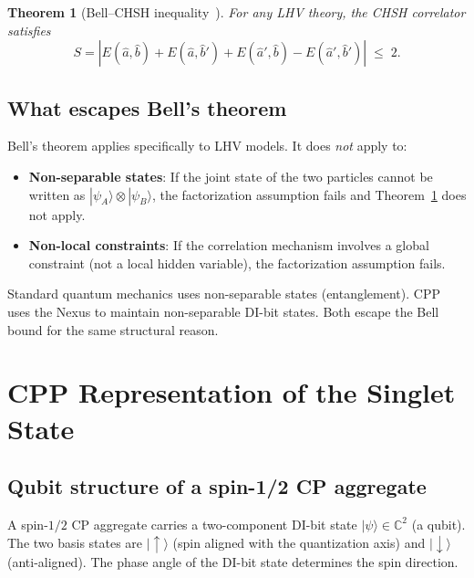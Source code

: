 \documentclass[11pt,a4paper]{article}
\newtheorem{theorem}{Theorem}[section]
\begin{document}
\begin{theorem}[Bell--CHSH inequality~\citep{bell1964,clauser1969}]
\label{thm:bell}
For any LHV theory, the CHSH correlator satisfies
\begin{equation}
S = |E(\hat{a},\hat{b}) + E(\hat{a},\hat{b}') + E(\hat{a}',\hat{b})
    - E(\hat{a}',\hat{b}')| \;\leq\; 2.
\label{eq:chsh}
\end{equation}
\end{theorem}

\subsection{What escapes Bell's theorem}

Bell's theorem applies specifically to LHV models.  It does \emph{not}
apply to:
\begin{itemize}
\item \textbf{Non-separable states}: If the joint state of the two
  particles cannot be written as $|\psi_A\rangle \otimes |\psi_B\rangle$,
  the factorization assumption fails and Theorem~\ref{thm:bell} does
  not apply.
\item \textbf{Non-local constraints}: If the correlation mechanism
  involves a global constraint (not a local hidden variable), the
  factorization assumption fails.
\end{itemize}

Standard quantum mechanics uses non-separable states (entanglement).
CPP uses the Nexus to maintain non-separable DI-bit states.  Both
escape the Bell bound for the same structural reason.

\section{CPP Representation of the Singlet State}
\label{sec:singlet}

\subsection{Qubit structure of a spin-1/2 CP aggregate}

A spin-$1/2$ CP aggregate carries a two-component DI-bit state
$|\psi\rangle \in \mathbb{C}^2$ (a qubit).  The two basis states are
$|\!\uparrow\rangle$ (spin aligned with the quantization axis) and
$|\!\downarrow\rangle$ (anti-aligned).  The phase angle of the DI-bit
state determines the spin direction.
\end{document}
